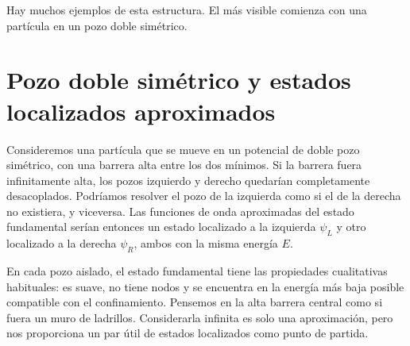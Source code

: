Hay muchos ejemplos de esta estructura. El más visible comienza con una partícula en un pozo doble simétrico.

\section{Pozo doble simétrico y estados localizados aproximados}

Consideremos una partícula que se mueve en un potencial de doble pozo simétrico, con una barrera alta entre los dos mínimos. Si la barrera fuera infinitamente alta, los pozos izquierdo y derecho quedarían completamente desacoplados. Podríamos resolver el pozo de la izquierda como si el de la derecha no existiera, y viceversa. Las funciones de onda aproximadas del estado fundamental serían entonces un estado localizado a la izquierda \(\psi_L\) y otro localizado a la derecha \(\psi_R\), ambos con la misma energía \(E\).

En cada pozo aislado, el estado fundamental tiene las propiedades cualitativas habituales: es suave, no tiene nodos y se encuentra en la energía más baja posible compatible con el confinamiento. Pensemos en la alta barrera central como si fuera un muro de ladrillos. Considerarla infinita es solo una aproximación, pero nos proporciona un par útil de estados localizados como punto de partida.

